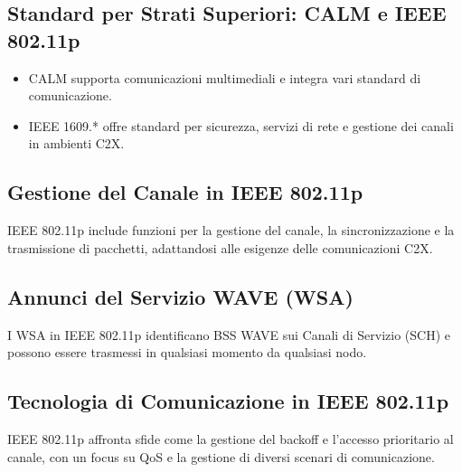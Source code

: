 \subsection{Standard per Strati Superiori: CALM e IEEE 802.11p}
\begin{itemize}
    \item CALM supporta comunicazioni multimediali e integra vari standard di comunicazione.
    \item IEEE 1609.* offre standard per sicurezza, servizi di rete e gestione dei canali in ambienti C2X.
\end{itemize}

\subsection{Gestione del Canale in IEEE 802.11p}
IEEE 802.11p include funzioni per la gestione del canale, la sincronizzazione e la trasmissione di pacchetti, adattandosi alle esigenze delle comunicazioni C2X.

\subsection{Annunci del Servizio WAVE (WSA)}
I WSA in IEEE 802.11p identificano BSS WAVE sui Canali di Servizio (SCH) e possono essere trasmessi in qualsiasi momento da qualsiasi nodo.

\subsection{Tecnologia di Comunicazione in IEEE 802.11p}
IEEE 802.11p affronta sfide come la gestione del backoff e l'accesso prioritario al canale, con un focus su QoS e la gestione di diversi scenari di comunicazione.
